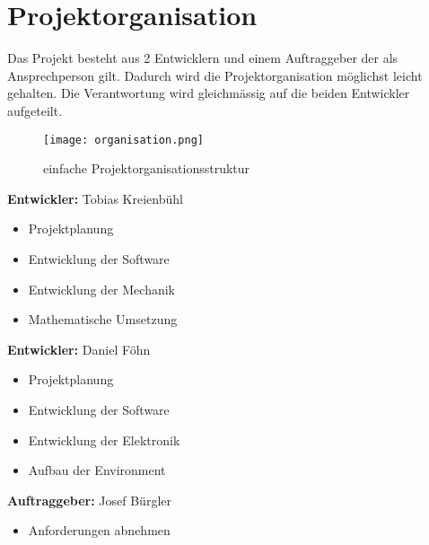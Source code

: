 \section{Projektorganisation}
    Das Projekt besteht aus 2 Entwicklern und einem Auftraggeber der als Ansprechperson gilt. Dadurch wird die Projektorganisation möglichst leicht gehalten. Die Verantwortung wird gleichmässig auf die beiden Entwickler aufgeteilt.
    \begin{figure}[H]
        \centering
        \texttt{[image: organisation.png]}
        \caption{einfache Projektorganisationsstruktur}
    \end{figure}
	\textbf{Entwickler:} Tobias Kreienbühl
    \begin{itemize}
        \item Projektplanung
        \item Entwicklung der Software
        \item Entwicklung der Mechanik
        \item Mathematische Umsetzung
    \end{itemize}
    \vspace{.5cm}
    \textbf{Entwickler:} Daniel Föhn
    \begin{itemize}
        \item Projektplanung
        \item Entwicklung der Software
        \item Entwicklung der Elektronik
        \item Aufbau der Environment
    \end{itemize}
    \vspace{.5cm}
    \textbf{Auftraggeber:} Josef Bürgler
    \begin{itemize}
        \item Anforderungen abnehmen
    \end{itemize}